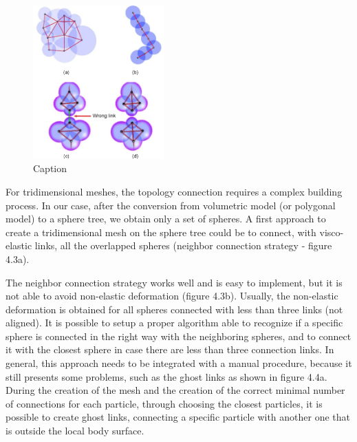\documentclass[journal]{vgtc}                %
\begin{document}
\begin{figure}[!t]
    \centering
    \includegraphics[width=0.45\textwidth]{Figures/Fig2.eps}
    \caption{Caption}
    \label{fig:fig2}
\end{figure}

For tridimensional meshes, the topology connection requires a complex building
process. In our case, after the conversion from volumetric model (or polygonal
model) to a sphere tree, we obtain only a set of spheres. A first approach to create a
tridimensional mesh on the sphere tree could be to connect, with visco-elastic links,
all the overlapped spheres (neighbor connection strategy - figure 4.3a).

The neighbor connection strategy works well and is easy to implement, but it is not
able to avoid non-elastic deformation (figure 4.3b). Usually, the non-elastic
deformation is obtained for all spheres connected with less than three links (not
aligned). It is possible to setup a proper algorithm able to recognize if a specific
sphere is connected in the right way with the neighboring spheres, and to connect it
with the closest sphere in case there are less than three connection links. In general,
this approach needs to be integrated with a manual procedure, because it still
presents some problems, such as the ghost links as shown in figure 4.4a. During the
creation of the mesh and the creation of the correct minimal number of connections
for each particle, through choosing the closest particles, it is possible to create ghost
links, connecting a specific particle with another one that is outside the local body
surface.
\end{document}
